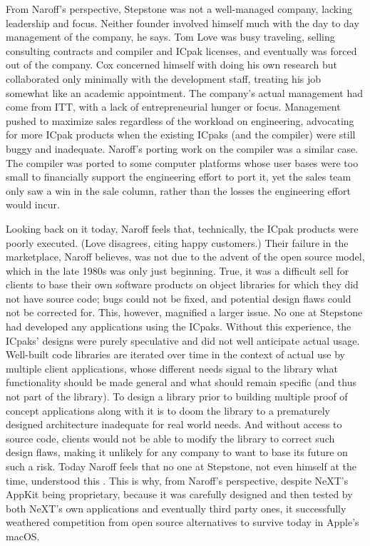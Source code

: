 \documentclass[acmsmall]{acmart}\settopmatter{}
\begin{document}
From Naroff's perspective, Stepstone was not a well-managed company, lacking leadership and focus. Neither founder involved himself much with the day to day management of the company, he says. Tom Love was busy traveling, selling consulting contracts and compiler and ICpak licenses, and eventually was forced out of the company. Cox concerned himself with doing his own research but collaborated only minimally with the development staff, treating his job somewhat like an academic appointment. The company's actual management had come from ITT, with a lack of entrepreneurial hunger or focus. Management pushed to maximize sales regardless of the workload on engineering, advocating for more ICpak products when the existing ICpaks (and the compiler) were still buggy and inadequate. Naroff's porting work on the compiler was a similar case. The compiler was ported to some computer platforms whose user bases were too small to financially support the engineering effort to port it, yet the sales team only saw a win in the sale column, rather than the losses the engineering effort would incur. 

Looking back on it today, Naroff feels that, technically, the ICpak products were poorly executed. (Love disagrees, citing happy customers.) Their failure in the marketplace, Naroff believes, was not due to the advent of the open source model, which in the late 1980s was only just beginning. True, it was a difficult sell for clients to base their own software products on object libraries for which they did not have source code; bugs could not be fixed, and potential design flaws could not be corrected for. This, however, magnified a larger issue. No one at Stepstone had developed any applications using the ICpaks. Without this experience, the ICpaks' designs were purely speculative and did not well anticipate actual usage. Well-built code libraries are iterated over time in the context of actual use by multiple client applications, whose different needs signal to the library what functionality should be made general and what should remain specific (and thus not part of the library). To design a library prior to building multiple proof of concept applications along with it is to doom the library to a prematurely designed architecture inadequate for real world needs. And without access to source code, clients would not be able to modify the library to correct such design flaws, making it unlikely for any company to want to base its future on such a risk. Today Naroff feels that no one at Stepstone, not even himself at the time, understood this \citep[24--25]{naroff_oral_2018}. This is why, from Naroff's perspective, despite NeXT's AppKit being proprietary, because it was carefully designed and then tested by both NeXT's own applications and eventually third party ones, it successfully weathered competition from open source alternatives to survive today in Apple's macOS. 
\end{document}
